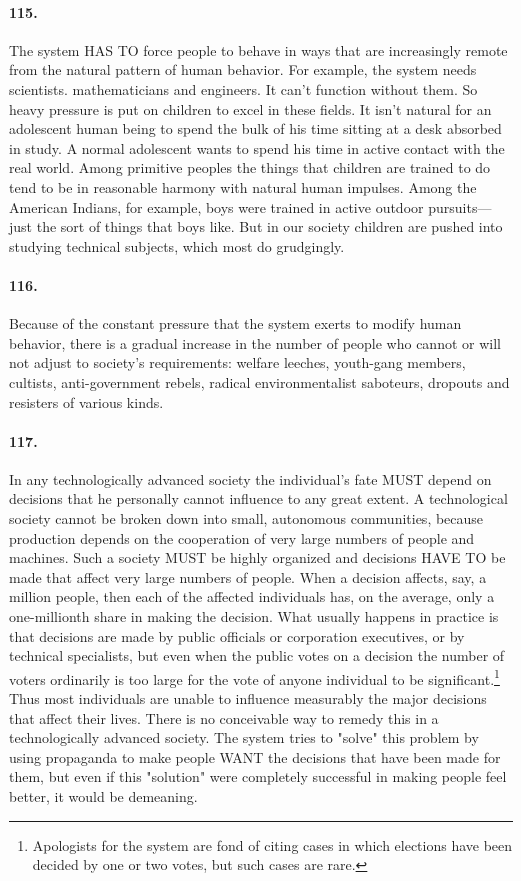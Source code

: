 \documentclass[12pt]{book}
\begin{document}
\paragraph{115.}  The system HAS TO force people to behave in ways that are increasingly remote from the natural pattern of human behavior. For example, the system needs scientists. mathematicians and engineers. It can't function without them. So heavy pressure is put on children to excel in these fields. It isn't natural for an adolescent human being to spend the bulk of his time sitting at a desk absorbed in study. A normal adolescent wants to spend his time in active contact with the real world. Among primitive peoples the things that children are trained to do tend to be in reasonable harmony with natural human impulses. Among the American Indians, for example, boys were trained in active outdoor pursuits---just the sort of things that boys like.  But in our society children are pushed into studying technical subjects, which most do grudgingly.


\paragraph{116.}  Because of the constant pressure that the system exerts to modify human behavior, there is a gradual increase in the number of people who cannot or will not adjust to society's requirements: welfare leeches, youth-gang members, cultists, anti-government rebels, radical environmentalist saboteurs, dropouts and resisters of various kinds.


\paragraph{117.}  In any technologically advanced society the individual's fate MUST depend on decisions that he personally cannot influence to any great extent.  A technological society cannot be broken down into small, autonomous communities, because production depends on the cooperation of very large numbers of people and machines. Such a society MUST be highly organized and decisions HAVE TO be made that affect very large numbers of people.  When a decision affects, say, a million people, then each of the affected individuals has, on the average, only a one-millionth share in making the decision. What usually happens in practice is that decisions are made by public officials or corporation executives, or by technical specialists, but even when the public votes on a decision the number of voters ordinarily is too large for the vote of anyone individual to be significant.\footnote{Apologists for the system are fond of citing cases in which elections have been decided by one or two votes, but such cases are rare.} Thus most individuals are unable to influence measurably the major decisions that affect their lives. There is no conceivable way to remedy this in a technologically advanced society. The system tries to "solve" this problem by using propaganda to make people WANT the decisions that have been made for them, but even if this "solution" were completely successful in making people feel better, it would be demeaning.
\end{document}
